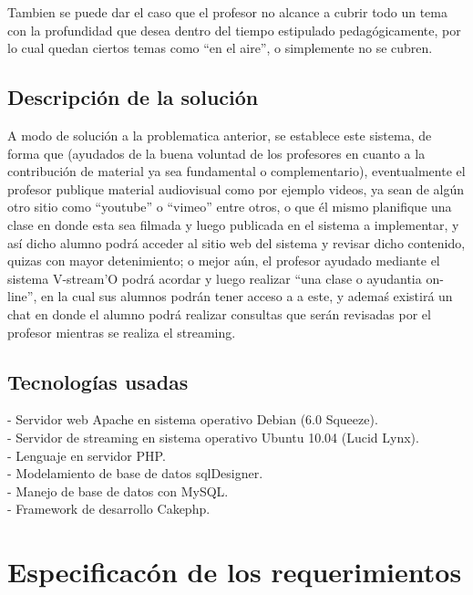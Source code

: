 \documentclass[12pt]{article}
\begin{document}
Tambien se puede dar el caso que el profesor no alcance a cubrir todo un tema con la profundidad que desea
dentro del tiempo estipulado pedagógicamente, por lo cual quedan ciertos temas como ``en el aire'', o
simplemente no se cubren.


\subsection{Descripción de la solución}
A modo de solución a la problematica anterior, se establece este sistema, de forma que (ayudados de la buena
voluntad de los profesores en cuanto a la contribución de material ya sea fundamental o complementario), 
eventualmente el profesor publique material
audiovisual como por ejemplo videos, ya sean de algún otro sitio como ``youtube'' o ``vimeo'' entre otros, o 
que él mismo planifique una clase en donde esta sea filmada y luego publicada en el sistema
a implementar, y así dicho alumno podrá acceder al sitio web del sistema y revisar dicho contenido, 
quizas con mayor detenimiento; o mejor aún, el profesor ayudado mediante el sistema V-stream'O podrá
acordar y luego realizar ``una clase o ayudantia on-line'', en la cual sus alumnos podrán tener acceso a 
a este, y ademaś existirá un chat en donde el alumno podrá realizar consultas que serán
revisadas por el profesor mientras se realiza el streaming.

\subsection{Tecnologías usadas}

- Servidor web Apache en sistema operativo Debian (6.0 Squeeze).\\

- Servidor de streaming en sistema operativo Ubuntu 10.04 (Lucid Lynx).\\

- Lenguaje en servidor PHP.\\

- Modelamiento de base de datos sqlDesigner.\\

- Manejo de base de datos con MySQL.\\

- Framework de desarrollo Cakephp.\\ 


\newpage
\section{Especificacón de los requerimientos}
\end{document}
